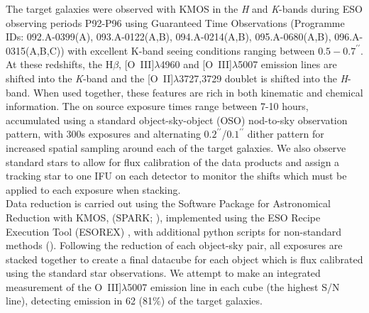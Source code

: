 \documentclass[fleqn,usenatbib]{mnras}
\begin{document}
The target galaxies were observed with KMOS in the {\it H} and {\it K}-bands during ESO observing periods P92-P96 using Guaranteed Time Observations (Programme IDs: 092.A-0399(A), 093.A-0122(A,B), 094.A-0214(A,B), 095.A-0680(A,B), 096.A-0315(A,B,C)) with excellent K-band seeing conditions ranging between $0.5-0.7^{\prime\prime}$.
At these redshifts, the H$\beta$, [O~{\sc III}]$\lambda$4960 and [O~{\sc III}]$\lambda$5007 emission lines are shifted into the {\it K}-band and the [O~{\sc II}]$\lambda$3727,3729 doublet is shifted into the {\it H}-band.
When used together, these features are rich in both kinematic and chemical information.
The on source exposure times range between 7-10 hours, accumulated using a standard object-sky-object (OSO) nod-to-sky observation pattern, with 300s exposures and alternating $0.2^{\prime\prime}$/$0.1^{\prime\prime}$ dither pattern for increased spatial sampling around each of the target galaxies.
We also observe standard stars to allow for flux calibration of the data products and assign a tracking star to one IFU on each detector to monitor the shifts which must be applied to each exposure when stacking. \\ 

\noindent
Data reduction is carried out using the Software Package for Astronomical Reduction with KMOS, (SPARK; \cite{Davies2013}), implemented using the ESO Recipe Execution Tool (ESOREX) \citep{Freudling2013}, with additional python scripts for non-standard methods (\cite{Turner2017}).
Following the reduction of each object-sky pair, all exposures are stacked together to create a final datacube for each object which is flux calibrated using the standard star observations. 
We attempt to make an integrated measurement of the O~{\sc III}]$\lambda$5007 emission line in each cube (the highest S/N line), detecting emission in 62 (81$\%$) of the target galaxies.
\end{document}

